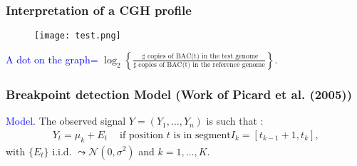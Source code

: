 \documentclass[compress]{beamer}
\begin{document}
\begin{frame}
\frametitle{Interpretation of a CGH profile}
\begin{figure}
\texttt{[image: test.png]}
\end{figure}
\vspace{0.2cm}

\centerline{
 \textcolor{blue}{ A dot on the graph=}
  $
  \displaystyle{
    \log_2 \left\{ \frac{\text{ $\sharp$ copies of BAC(t) in the test
          genome }}{\text{$\sharp$ copies of BAC(t) in the reference
          genome}}\right\}}.
  $
}


\end{frame}
\begin{frame}
\frametitle{Breakpoint detection Model \small{(Work of Picard et
al. (2005))}}

 \textcolor{blue}{Model.} The observed signal $Y=(Y_1,\ldots,Y_n)$ is such that :
\begin{eqnarray*}
Y_t=\mu_k + E_t \ \ \ \  \mbox{ if position $t$ is in segment
$I_k=[t_{k-1}+1,t_{k}]$,}
\end{eqnarray*}
with $\{E_t\}$ i.i.d. $\leadsto \mathcal{N}(0,\sigma^2)$ and $k=1,\ldots,K$.\\

\end{frame}

\end{document}
